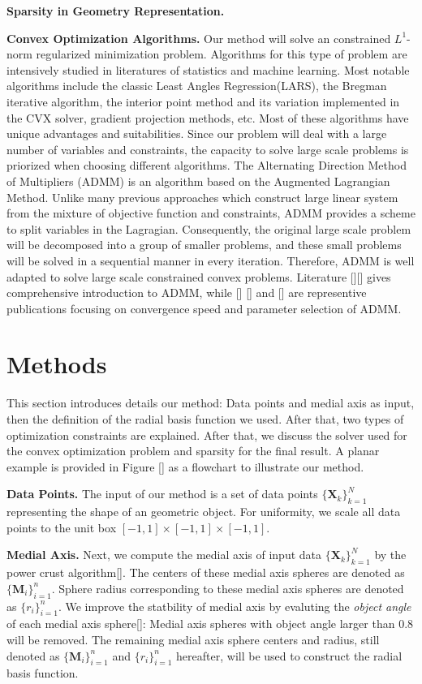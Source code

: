 \documentclass[annual]{acmsiggraph}
\begin{document}
\textbf{Sparsity in Geometry Representation. } 

\textbf{Convex Optimization Algorithms. }
Our method will solve an constrained $L^1$-norm regularized minimization problem. Algorithms for this type of problem are intensively studied in literatures of statistics and machine learning. Most notable algorithms include the classic Least Angles Regression(LARS), the Bregman iterative algorithm, the interior point method and its variation implemented in the CVX solver, gradient projection methods, etc. Most of these algorithms have unique advantages and suitabilities. Since our problem will deal with a large number of variables and constraints, the capacity to solve large scale problems is priorized when choosing different algorithms. The Alternating Direction Method of Multipliers (ADMM) is an algorithm based on the Augmented Lagrangian Method. Unlike many previous approaches which construct large linear system from the mixture of objective function and constraints, ADMM provides a scheme to split variables in the Lagragian. Consequently, the original large scale problem will be decomposed into a group of smaller problems, and these small problems will be solved in a sequential manner in every iteration. Therefore, ADMM is well adapted to solve large scale constrained convex problems. Literature [][] gives comprehensive introduction to ADMM, while [] [] and [] are representive publications focusing on convergence speed and parameter selection of ADMM.

\section{Methods}

This section introduces details our method: Data points and medial axis as input, then the definition of the radial basis function we used. After that, two types of optimization constraints are explained. After that, we discuss the solver used for the convex optimization problem and sparsity for the final result. A planar example is provided in Figure [] as a flowchart to illustrate our method. 

\textbf{Data Points. }
The input of our method is a set of data points $\{\mathbf{X}_k\}_{k=1}^N$ representing the shape of an geometric object. For uniformity, we scale all data points to the unit box $[-1,1]\times[-1,1]\times[-1,1]$. 

\textbf{Medial Axis. }
Next, we compute the medial axis of input data $\{\mathbf{X}_k\}_{k=1}^N$ by the power crust algorithm[]. The centers of these medial axis spheres are denoted as $\{\mathbf{M}_i\}_{i=1}^n$. Sphere radius corresponding to these medial axis spheres are denoted as $\{r_i\}_{i=1}^n$. We improve the statbility of medial axis by evaluting the \textit{object angle} of each medial axis sphere[]: Medial axis spheres with object angle larger than 0.8 will be removed. The remaining medial axis sphere centers and radius, still denoted as $\{\mathbf{M}_i\}_{i=1}^n$ and $\{r_i\}_{i=1}^n$ hereafter, will be used to construct the radial basis function.
\end{document}
